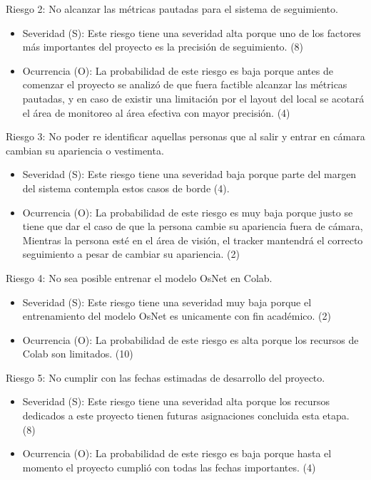 \documentclass[11pt]{charter}
\begin{document}
Riesgo 2: No alcanzar las métricas pautadas para el sistema de seguimiento.
\begin{itemize}
\item Severidad (S): Este riesgo tiene una severidad alta porque uno de los factores más importantes del proyecto es la precisión de seguimiento. (8)
\item Ocurrencia (O): La probabilidad de este riesgo es baja porque antes de comenzar el proyecto se analizó de que fuera factible alcanzar las métricas pautadas, y en caso de existir una limitación por el layout del local se acotará el área de monitoreo al área efectiva con mayor precisión. (4)
\end{itemize}

Riesgo 3: No poder re identificar aquellas personas que al salir y entrar en cámara cambian su apariencia o vestimenta.
\begin{itemize}
\item Severidad (S): Este riesgo tiene una severidad baja porque parte del margen del sistema contempla estos casos de borde (4).
\item Ocurrencia (O): La probabilidad de este riesgo es muy baja porque justo se tiene que dar el caso de que la persona cambie su apariencia fuera de cámara, Mientras la persona esté en el área de visión, el tracker mantendrá el correcto seguimiento a pesar de cambiar su apariencia. (2)
\end{itemize}

Riesgo 4: No sea posible entrenar el modelo OsNet en Colab.
\begin{itemize}
\item Severidad (S): Este riesgo tiene una severidad muy baja porque el entrenamiento del modelo OsNet es unicamente con fin académico. (2)
\item Ocurrencia (O): La probabilidad de este riesgo es alta porque los recursos de Colab son limitados. (10)
\end{itemize}

\newpage

Riesgo 5: No cumplir con las fechas estimadas de desarrollo del proyecto.
\begin{itemize}
\item Severidad (S): Este riesgo tiene una severidad alta porque los recursos dedicados a este proyecto tienen futuras asignaciones concluida esta etapa. (8)
\item Ocurrencia (O): La probabilidad de este riesgo es baja porque hasta el momento el proyecto cumplió con todas las fechas importantes. (4)
\end{itemize}
\end{document}
